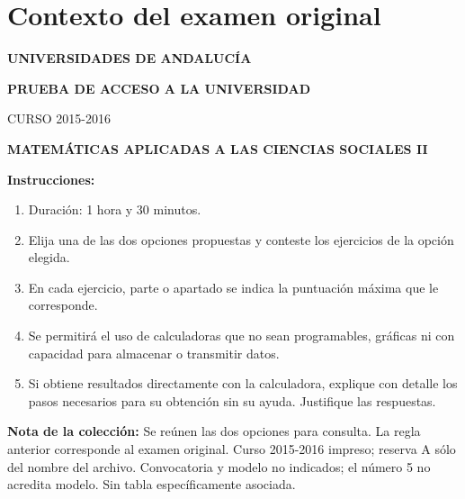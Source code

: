 \section*{Contexto del examen original}
\textbf{UNIVERSIDADES DE ANDALUCÍA}\par
\textbf{PRUEBA DE ACCESO A LA UNIVERSIDAD}\par
CURSO 2015-2016\par
\textbf{MATEMÁTICAS APLICADAS A LAS CIENCIAS SOCIALES II}

\textbf{Instrucciones:}
\begin{enumerate}[label=\textbf{\alph*)}]
  \item Duración: 1 hora y 30 minutos.
  \item Elija una de las dos opciones propuestas y conteste los ejercicios de la opción elegida.
  \item En cada ejercicio, parte o apartado se indica la puntuación máxima que le corresponde.
  \item Se permitirá el uso de calculadoras que no sean programables, gráficas ni con capacidad para almacenar o transmitir datos.
  \item Si obtiene resultados directamente con la calculadora, explique con detalle los pasos necesarios para su obtención sin su ayuda. Justifique las respuestas.
\end{enumerate}
\noindent\textbf{Nota de la colección:} Se reúnen las dos opciones para consulta.
La regla anterior corresponde al examen original. Curso 2015-2016 impreso; reserva A sólo del nombre del archivo. Convocatoria y modelo no indicados; el número 5 no acredita modelo. Sin tabla específicamente asociada.
\par\medskip
